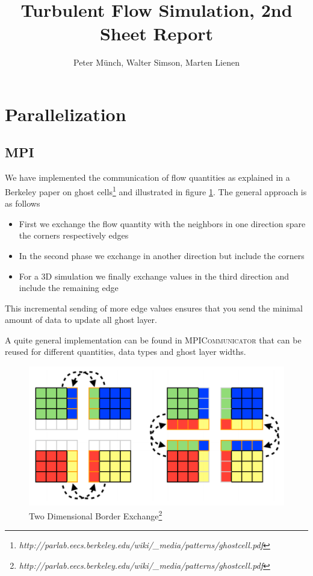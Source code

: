 \documentclass[11pt,a4paper]{article}
\title{Turbulent Flow Simulation, 2nd Sheet Report}
\author{Peter Münch, Walter Simson, Marten Lienen}
\begin{document}
\newcommand{\abl}[2]{\frac{\partial \, #1}{\partial \, #2}}
\newcommand{\abll}[2]{\frac{\partial^2 \, #1}{\partial \, #2^2}}
\newcommand{\ave}[1]{\left\langle#1\right\rangle}
\newcommand{\new}[1]{\textcolor{red}{#1}}

\maketitle

\section{Parallelization}

\subsection{MPI}

We have implemented the communication of flow quantities as explained in a
Berkeley paper on ghost
cells\footnote{\emph{http://parlab.eecs.berkeley.edu/wiki/\_media/patterns/ghostcell.pdf}}
and illustrated in figure \ref{fig:border-exchange}. The general approach is as follows

\begin{itemize}
\item First we exchange the flow quantity with the neighbors in one direction spare the corners respectively edges
\item In the second phase we exchange in another direction but include the corners
\item For a 3D simulation we finally exchange values in the third direction and include the remaining edge
\end{itemize}

This incremental sending of more edge values ensures that you send the minimal
amount of data to update all ghost layer.

A quite general implementation can be found in \textsc{MPICommunicator} that can
be reused for different quantities, data types and ghost layer widths.

\begin{figure}[h]
  \centering
  \includegraphics[width=\textwidth]{border-exchange}
  \caption{Two Dimensional Border Exchange\footnote[1]{\emph{http://parlab.eecs.berkeley.edu/wiki/\_media/patterns/ghostcell.pdf}}}
  \label{fig:border-exchange}
\end{figure}
\end{document}
